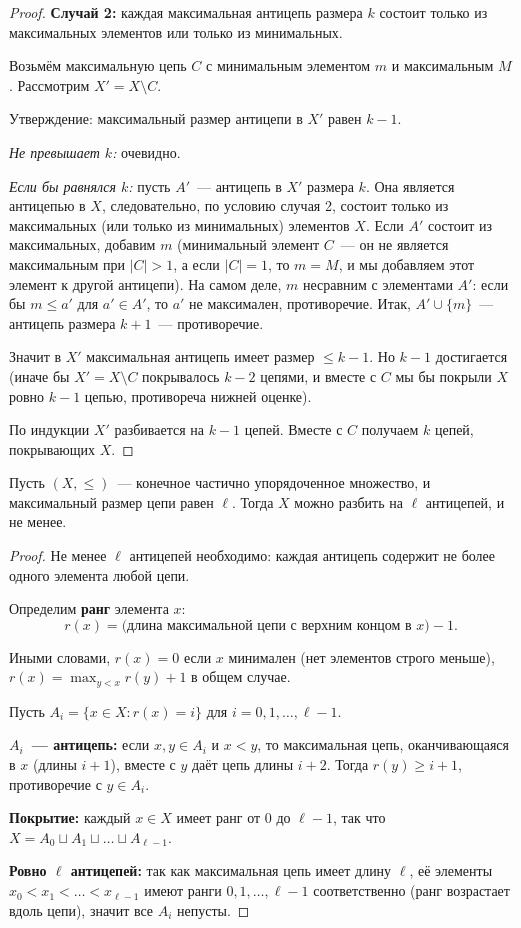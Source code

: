 \documentclass[12pt]{article}
\begin{document}
\begin{proof}
		\textbf{Случай 2:} каждая максимальная антицепь размера $k$ состоит только из максимальных элементов или только из минимальных.
		
		Возьмём максимальную цепь $C$ с минимальным элементом $m$ и максимальным $M$. Рассмотрим $X' = X \setminus C$.
		
		Утверждение: максимальный размер антицепи в $X'$ равен $k - 1$.
		
		\textit{Не превышает $k$:} очевидно.
		
		\textit{Если бы равнялся $k$:} пусть $A'$~--- антицепь в $X'$ размера $k$. Она является антицепью в $X$, следовательно, по условию случая 2, состоит только из максимальных (или только из минимальных) элементов $X$. Если $A'$ состоит из максимальных, добавим $m$ (минимальный элемент $C$~--- он не является максимальным при $|C| > 1$, а если $|C| = 1$, то $m = M$, и мы добавляем этот элемент к другой антицепи). На самом деле, $m$ несравним с элементами $A'$: если бы $m \leqslant a'$ для $a' \in A'$, то $a'$ не максимален, противоречие. Итак, $A' \cup \{m\}$~--- антицепь размера $k + 1$~--- противоречие.
		
		Значит в $X'$ максимальная антицепь имеет размер $\leqslant k - 1$. Но $k - 1$ достигается (иначе бы $X' = X \setminus C$ покрывалось $k - 2$ цепями, и вместе с $C$ мы бы покрыли $X$ ровно $k - 1$ цепью, противореча нижней оценке).
		
		По индукции $X'$ разбивается на $k - 1$ цепей. Вместе с $C$ получаем $k$ цепей, покрывающих $X$.
	\end{proof}
	
	\begin{theorem}[Мирский]
		Пусть $(X, \leqslant)$~--- конечное частично упорядоченное множество, и максимальный размер цепи равен $\ell$. Тогда $X$ можно разбить на $\ell$ антицепей, и не менее.
	\end{theorem}
	
	\begin{proof}
		Не менее $\ell$ антицепей необходимо: каждая антицепь содержит не более одного элемента любой цепи.
		
		Определим \textbf{ранг} элемента $x$:
		\[r(x) = \text{(длина максимальной цепи с верхним концом в } x) - 1.\]
		
		Иными словами, $r(x) = 0$ если $x$ минимален (нет элементов строго меньше), $r(x) = \max_{y < x} r(y) + 1$ в общем случае.
		
		Пусть $A_i = \{x \in X : r(x) = i\}$ для $i = 0, 1, \dots, \ell - 1$.
		
		\textbf{$A_i$~--- антицепь:} если $x, y \in A_i$ и $x < y$, то максимальная цепь, оканчивающаяся в $x$ (длины $i + 1$), вместе с $y$ даёт цепь длины $i + 2$. Тогда $r(y) \geqslant i + 1$, противоречие с $y \in A_i$.
		
		\textbf{Покрытие:} каждый $x \in X$ имеет ранг от $0$ до $\ell - 1$, так что $X = A_0 \sqcup A_1 \sqcup \dots \sqcup A_{\ell - 1}$.
		
		\textbf{Ровно $\ell$ антицепей:} так как максимальная цепь имеет длину $\ell$, её элементы $x_0 < x_1 < \dots < x_{\ell-1}$ имеют ранги $0, 1, \dots, \ell - 1$ соответственно (ранг возрастает вдоль цепи), значит все $A_i$ непусты.
	\end{proof}
	
\end{document}
